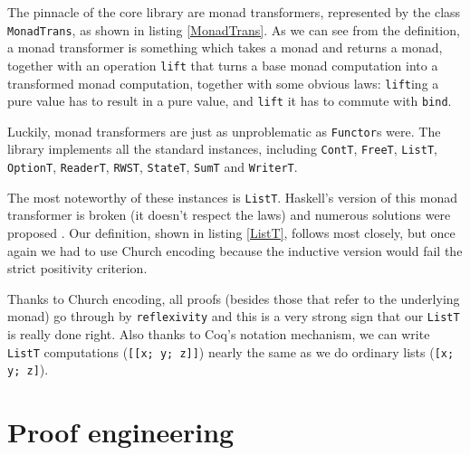 \documentclass[declaration,inz,english,shortabstract]{iithesis}
\newcommand{\m}[1]{\texttt{#1}}
\begin{document}

The pinnacle of the core library are monad transformers, represented by the class \m{MonadTrans}, as shown in listing \ref{MonadTrans}. As we can see from the definition, a monad transformer is something which takes a monad and returns a monad, together with an operation \m{lift} that turns a base monad computation into a transformed monad computation, together with some obvious laws: \m{lift}ing a pure value has to result in a pure value, and \m{lift} it has to commute with \m{bind}.

Luckily, monad transformers are just as unproblematic as \m{Functor}s were. The library implements all the standard instances, including \m{ContT}, \m{FreeT}, \m{ListT}, \m{OptionT}, \m{ReaderT}, \m{RWST}, \m{StateT}, \m{SumT} and \m{WriterT}.


The most noteworthy of these instances is \m{ListT}. Haskell's version of this monad transformer is broken (it doesn't respect the laws) and numerous solutions were proposed \cite{ListT1} \cite{ListT2} \cite{ListT3}. Our definition, shown in listing \ref{ListT}, follows \cite{ListT1} most closely, but once again we had to use Church encoding because the inductive version would fail the strict positivity criterion.

Thanks to Church encoding, all proofs (besides those that refer to the underlying monad) go through by \m{reflexivity} and this is a very strong sign that our \m{ListT} is really done right. Also thanks to Coq's notation mechanism, we can write \m{ListT} computations (\m{[[x; y; z]]}) nearly the same as we do ordinary lists (\m{[x; y; z]}).

\section{Proof engineering}
\end{document}
